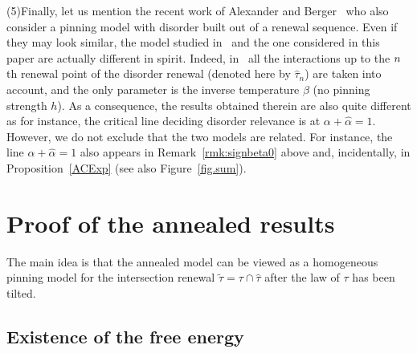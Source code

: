 \documentclass[AHL,Unicode,longabstracts]{cedram}
\newcommand{\ga}{\alpha}
\newcommand{\gb}{\beta}
\renewcommand{\tilde}{\widetilde}
\newcommand{\htau}{\hat\tau}
\begin{document}
\noindent (5)\enskip Finally, let us mention the recent work of Alexander and Berger~\cite{A17_1} who also consider a pinning model with disorder built out of a renewal sequence. Even if they may look similar, the model studied in~\cite{A17_1} and the one considered in this paper are actually different in spirit. Indeed, in~\cite{A17_1} all the interactions up to the $n\mskip 1mu$th renewal point of the disorder renewal (denoted here by $\htau_n$) are taken into account, and the only parameter is the inverse temperature $\gb$ (no pinning strength $h$). As a consequence, the results obtained therein are also quite different as for instance, the critical line deciding disorder relevance is at $\ga + \hat \ga = 1$. However, we do not exclude that the two models are related. For instance, the line $\ga + \hat \ga = 1$ also appears in Remark~\ref{rmk:signbeta0} above and, incidentally, in Proposition~\ref{ACExp} (see also Figure~\ref{fig.sum}).

\section{Proof of the annealed results}\label{sec3}

The main idea is that the annealed model can be viewed as a homogeneous pinning model for the intersection renewal $\tilde\tau = \tau \cap \htau$ after the law of $\tau$ has been tilted.

\subsection{Existence of the free energy}\label{sec3.1}
\end{document}
